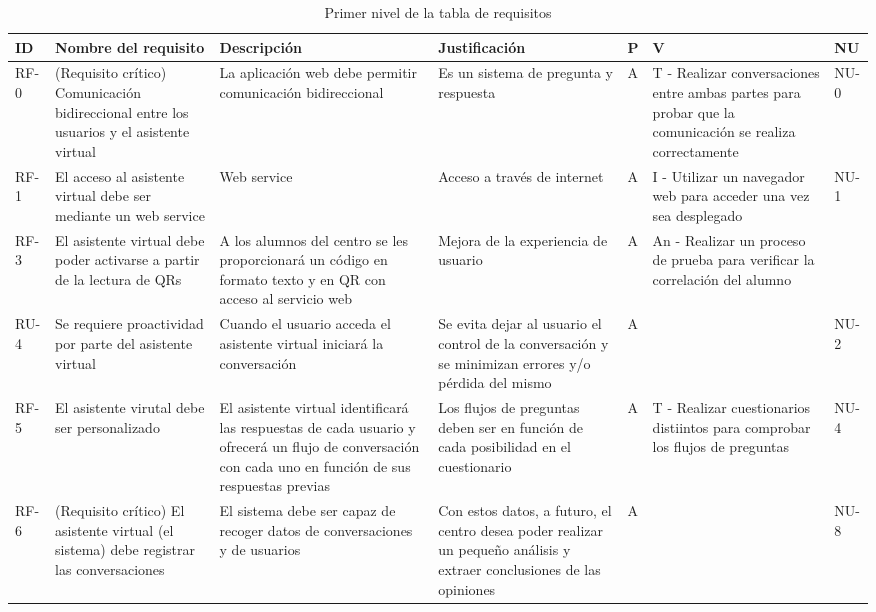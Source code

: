 \begin{table}[ht]
\begin{centering}
\begin{tabular}{|l|>{\centering}p{}|>{\centering}p{}|>{\centering}p{}|>{\centering}p{}|>{\centering}p{}|l|}
\hline
ID & Nombre del requisito & Descripción & Justificación & P & V & NU \\ \hline
RF-0&  (Requisito crítico) Comunicación bidireccional entre los usuarios y el asistente virtual & La aplicación web debe permitir comunicación bidireccional  & Es un sistema de pregunta y respuesta  & A & T - Realizar conversaciones entre ambas partes para probar que la comunicación se realiza correctamente & NU-0 \\ \hline
RF-1&  El acceso al asistente virtual debe ser mediante un web service & Web service  & Acceso a través de internet  & A & I - Utilizar un navegador web para acceder una vez sea desplegado & NU-1 \\ \hline
RF-3 &  El asistente virtual debe poder activarse a partir de la lectura de QRs & A los alumnos del centro se les proporcionará un código en formato texto y en QR con acceso al servicio web  & Mejora de la experiencia de usuario  & A & An - Realizar un proceso de prueba para verificar la correlación del alumno  & \\ \hline
RU-4 & Se requiere proactividad por parte del asistente virtual & Cuando el usuario acceda el asistente virtual iniciará la conversación  & Se evita dejar al usuario el control de la conversación y se minimizan errores y/o pérdida del mismo  & A &  &  NU-2 \\ \hline
RF-5 &  El asistente virutal debe ser personalizado & El asistente virtual identificará las respuestas de cada usuario y ofrecerá un flujo de conversación con cada uno en función de sus respuestas previas  & Los flujos de preguntas deben ser en función de cada posibilidad en el cuestionario & A & T - Realizar cuestionarios distiintos para comprobar los flujos de preguntas & NU-4 \\ \hline
RF-6&  (Requisito crítico) El asistente virtual (el sistema) debe registrar las conversaciones & El sistema debe ser capaz de recoger datos de conversaciones y de usuarios  & Con estos datos, a futuro, el centro desea poder realizar un pequeño análisis y extraer conclusiones de las opiniones  & A &  & NU-8 \\ \hline
\end{tabular}
\caption{Primer nivel de la tabla de requisitos}
\end{centering}
\end{table}





